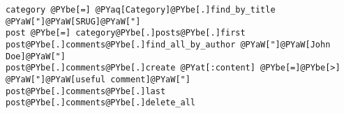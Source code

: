 \begin{Verbatim}[commandchars=@\[\]]
category @PYbe[=] @PYaq[Category]@PYbe[.]find_by_title @PYaW["]@PYaW[SRUG]@PYaW["]
post @PYbe[=] category@PYbe[.]posts@PYbe[.]first
post@PYbe[.]comments@PYbe[.]find_all_by_author @PYaW["]@PYaW[John Doe]@PYaW["]
post@PYbe[.]comments@PYbe[.]create @PYat[:content] @PYbe[=]@PYbe[>] @PYaW["]@PYaW[useful comment]@PYaW["]
post@PYbe[.]comments@PYbe[.]last
post@PYbe[.]comments@PYbe[.]delete_all
\end{Verbatim}
